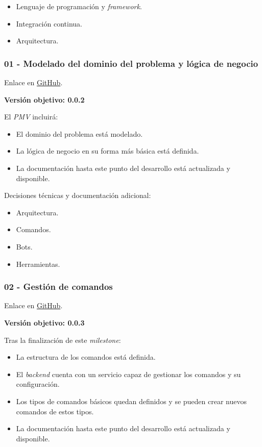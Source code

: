 \begin{itemize}
	\item Lenguaje de programación y \textit{framework}.
	\item Integración continua.
	\item Arquitectura.
\end{itemize}

\subsubsection{01 - Modelado del dominio del problema y lógica de negocio}

Enlace en \href{https://github.com/harvestcore/matroos/milestone/12}{GitHub}.

\textbf{Versión objetivo: 0.0.2}

El \textit{PMV} incluirá:

\begin{itemize}
	\item El dominio del problema está modelado.
	\item La lógica de negocio en su forma más básica está definida.
	\item La documentación hasta este punto del desarrollo está actualizada y disponible.
\end{itemize}

Decisiones técnicas y documentación adicional:

\begin{itemize}
	\item Arquitectura.
	\item Comandos.
	\item Bots.
	\item Herramientas.
\end{itemize}

\subsubsection{02 - Gestión de comandos}

Enlace en \href{https://github.com/harvestcore/matroos/milestone/10}{GitHub}.

\textbf{Versión objetivo: 0.0.3}

Tras la finalización de este \textit{milestone}:

\begin{itemize}
	\item La estructura de los comandos está definida.
	\item El \textit{backend} cuenta con un servicio capaz de gestionar los comandos y su configuración.
	\item Los tipos de comandos básicos quedan definidos y se pueden crear nuevos comandos de estos tipos.
	\item La documentación hasta este punto del desarrollo está actualizada y disponible.
\end{itemize}

